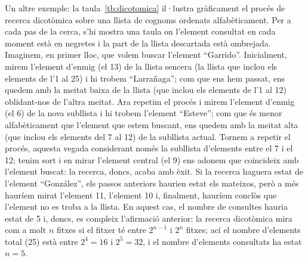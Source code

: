 Un altre exemple: la taula~\ref{tb:dicotomica} il·lustra gràficament
el procés de recerca dicotòmica sobre una llista de cognoms ordenats
alfabèticament. Per a cada pas de la cerca, s'hi mostra una taula on
l'element consultat en cada moment està en negretes i la part de la
llista descartada està ombrejada. Imaginem, en primer lloc, que volem
buscar l'element ``Garrido''. Inicialment, mirem l'element d'enmig (el
13) de la llista sencera (la llista que inclou els elements de l'1 al
25) i hi trobem ``Larrañaga''; com que ens hem passat, ens quedem amb
la meitat baixa de la llista (que inclou els elements de l'1 al 12)
oblidant-nos de l'altra meitat. Ara repetim el procés i mirem
l'element d'enmig (el 6) de la nova subllista i hi trobem l'element
``Esteve''; com que és menor alfabèticament que l'element que estem
buscant, ens quedem amb la meitat alta (que inclou els elements del 7
al 12) de la subllista actual. Tornem a repetir el procés, aquesta
vegada considerant només la subllista d'elements entre el 7 i el 12;
tenim sort i en mirar l'element central (el 9) ens adonem que
coincideix amb l'element buscat: la recerca, doncs, acaba amb èxit.
Si la recerca haguera estat de l'element ``González'', els passos
anteriors haurien estat els mateixos, però a més hauríem mirat
l'element 11, l'element 10 i, finalment, hauríem conclòs que l'element
no es troba a la llista. En aquest cas, el nombre de consultes hauria
estat de 5 i, doncs, es compleix l'afirmació anterior: la recerca
dicotòmica mira com a molt $n$ fitxes si el fitxer té entre $2^{n-1}$
i $2^n$ fitxes; ací el nombre d'elements total (25) està entre
$2^4=16$ i $2^5=32$, i el nombre d'elements consultats ha estat $n=5$.

